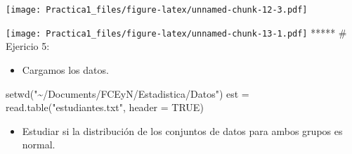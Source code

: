 \documentclass[
]{article}
\newenvironment{Shaded}{\begin{snugshade}}{\end{snugshade}}
\newcommand{\AttributeTok}[1]{\textcolor[rgb]{0.77,0.63,0.00}{#1}}
\newcommand{\ConstantTok}[1]{\textcolor[rgb]{0.00,0.00,0.00}{#1}}
\newcommand{\FunctionTok}[1]{\textcolor[rgb]{0.00,0.00,0.00}{#1}}
\newcommand{\NormalTok}[1]{#1}
\newcommand{\OtherTok}[1]{\textcolor[rgb]{0.56,0.35,0.01}{#1}}
\newcommand{\SpecialCharTok}[1]{\textcolor[rgb]{0.00,0.00,0.00}{#1}}
\newcommand{\StringTok}[1]{\textcolor[rgb]{0.31,0.60,0.02}{#1}}
\providecommand{\tightlist}{%
  \setlength{\itemsep}{0pt}\setlength{\parskip}{0pt}}
\begin{document}
\begin{Shaded}
\end{Shaded}

\texttt{[image: Practica1\_files/figure-latex/unnamed-chunk-12-3.pdf]}

\begin{Shaded}
\end{Shaded}

\texttt{[image: Practica1\_files/figure-latex/unnamed-chunk-13-1.pdf]}
***** \# Ejericio 5:

\begin{itemize}
\tightlist
\item
  Cargamos los datos.
\end{itemize}

\begin{Shaded}
\begin{Highlighting}[]
\FunctionTok{setwd}\NormalTok{(}\StringTok{"\textasciitilde{}/Documents/FCEyN/Estadistica/Datos"}\NormalTok{)}
\NormalTok{est }\OtherTok{=} \FunctionTok{read.table}\NormalTok{(}\StringTok{"estudiantes.txt"}\NormalTok{, }\AttributeTok{header =} \ConstantTok{TRUE}\NormalTok{)}
\end{Highlighting}
\end{Shaded}

\begin{itemize}
\tightlist
\item
  Estudiar si la distribución de los conjuntos de datos para ambos
  grupos es normal.
\end{itemize}

\begin{Shaded}
\end{Shaded}
\end{document}
